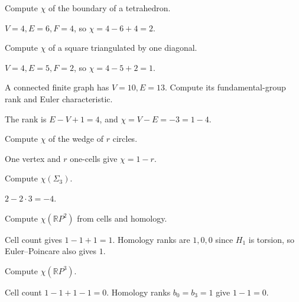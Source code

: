 \begin{problem}\label{prob:viii21-02}
Compute \(\chi\) of the boundary of a tetrahedron.
\end{problem}
\begin{solution}
\(V=4,E=6,F=4\), so \(\chi=4-6+4=2\).
\end{solution}

\begin{problem}\label{prob:viii21-03}
Compute \(\chi\) of a square triangulated by one diagonal.
\end{problem}
\begin{solution}
\(V=4,E=5,F=2\), so \(\chi=4-5+2=1\).
\end{solution}

\begin{problem}\label{prob:viii21-04}
A connected finite graph has \(V=10,E=13\). Compute its fundamental-group rank and Euler characteristic.
\end{problem}
\begin{solution}
The rank is \(E-V+1=4\), and \(\chi=V-E=-3=1-4\).
\end{solution}

\begin{problem}[Rose]\label{prob:viii21-05}
Compute \(\chi\) of the wedge of \(r\) circles.
\end{problem}
\begin{solution}
One vertex and \(r\) one-cells give \(\chi=1-r\).
\end{solution}

\begin{problem}\label{prob:viii21-06}
Compute \(\chi(\Sigma_3)\).
\end{problem}
\begin{solution}
\(2-2\cdot3=-4\).
\end{solution}

\begin{problem}\label{prob:viii21-07}
Compute \(\chi(\mathbb RP^2)\) from cells and homology.
\end{problem}
\begin{solution}
Cell count gives \(1-1+1=1\). Homology ranks are \(1,0,0\) since \(H_1\) is torsion, so Euler--Poincare also gives \(1\).
\end{solution}

\begin{problem}\label{prob:viii21-08}
Compute \(\chi(\mathbb RP^3)\).
\end{problem}
\begin{solution}
Cell count \(1-1+1-1=0\). Homology ranks \(b_0=b_3=1\) give \(1-1=0\).
\end{solution}

